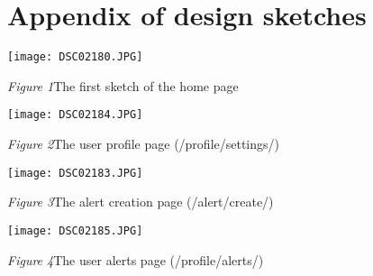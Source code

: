 \clearpage
\section{Appendix of design sketches}

\begin{flushleft}
    \texttt{[image: DSC02180.JPG]}

    \emph{Figure 1}The first sketch of the home page
    \vspace{5mm}

    \texttt{[image: DSC02184.JPG]}

    \emph{Figure 2}The user profile page (/profile/settings/)
    \vspace{5mm}

    \texttt{[image: DSC02183.JPG]}

    \emph{Figure 3}The alert creation page (/alert/create/)
    \vspace{5mm}

    \texttt{[image: DSC02185.JPG]}

    \emph{Figure 4}The user alerts page (/profile/alerts/)
    \vspace{5mm}
\end{flushleft}
